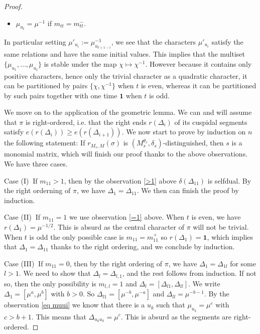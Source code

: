 \documentclass[11pt,letterpaper]{amsart}
\newcommand{\triv}{{\mathbf{1}}}
\def\D{\Delta}
\def\d{\delta}
\theoremstyle{plain}
\numberwithin{equation}{section}
\begin{document}
\begin{proof}
\begin{enumerate}
\begin{itemize}
\begin{itemize}
	\item $\mu_{u_t} = \mu^{-1}$ if $m_{t t}=m_{t t}^-$.
\end{itemize}
In particular setting $\mu'_{u_i}:=\mu_{u_{t+1-i}}^{-1}$, we see that the characters $\mu'_{u_i}$ satisfy the same relations and have the same initial values. This implies that the multiset $\{\mu_{u_1},\dots,\mu_{u_t}\}$ is stable under the map $\chi\mapsto \chi^{-1}$. However because it contains only positive characters, hence only the trivial character as a quadratic character, it can be partitioned by pairs $\{\chi,\chi^{-1}\}$ when $t$ is even, whereas it can be partitioned by such pairs together with one time $\triv$ when $t$ is odd. 
\end{itemize}
\end{enumerate}


We move on to the application of the geometric lemma. We can and will assume that $\pi$ is right-ordered, i.e. that the right ends $r(\D_i)$ of its cuspidal segments satisfy $e(r(\D_i))\geq e(r(\D_{i+1}))$. We now start to prove by induction on $n$ the following statement: If  $r_{M_s,M}(\sigma)$ is $(M_s^{\theta_s},\delta_s )$-distinguished, then $s $ is a monomial matrix, which will finish our proof thanks to the above observations. We have three cases.

Case (I)$\ $ If $m_{1 1} > 1$, then by the observation \eqref{>1} above $\d(\D_{1 1})$ is selfdual. By the right orderning of $\pi$, we have $\D_1 = \D_{1 1}$. We then can finish the proof by induction.

Case (II)$\ $ If $m_{1 1} = 1$ we use observation \eqref{=1} above. When $t$ is even, we have $r(\D_1) = \mu^{-1/2}$. This is absurd as the central character of $\pi$ will not be trivial. When $t$ is odd the only possible case is $m_{1 1}=m_{1 1}^+$ so $r(\D_1) = \triv$, which implies that $\D_1 = \D_{1 1}$ thanks to the right ordering, and we conclude by induction. 

Case (III)$\ $ If $m_{1 1} = 0$, then by the right ordering of $\pi$, we have $\D_1 = \D_{1 l}$ for some $l >1$. We need to show that $\D_l = \D_{l,1}$, and the rest follows from induction. If not so, then the only possibility is $m_{l,l} = 1$ and $\D_l =[\D_{l 1},\D_{l l}]$. We write $\D_1 = [\mu^a,\mu^b]$ with $b > 0$. So $\D_{l 1} = [\mu^{-b},\mu^{-a}]$ and $\D_{l l} = \mu^{-b-1}$. By the observation \eqref{eq muui} we know that there is a $u_k$ such that $\mu_{u_k} = \mu^c$ with $c > b+1$. This means that $\D_{u_k u_k} = \mu^c$. This is absurd as the segments are right-ordered.
\end{proof}
\end{document}
